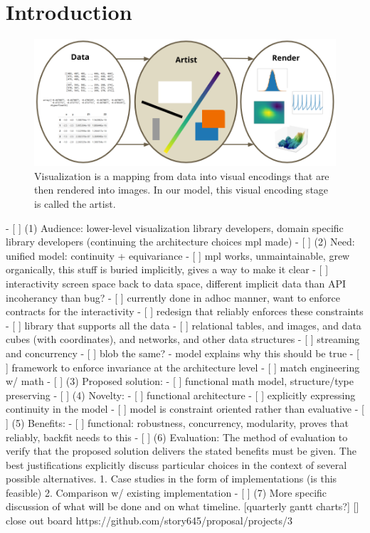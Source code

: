 \documentclass[../main.tex]{subfiles}
\begin{document}
\section{Introduction}
\label{sec:intro}
\begin{figure}[H]
    \includegraphics[width=\textwidth]{figures/intro/dar.png}
    \caption{Visualization is a mapping from data into visual encodings that are then rendered into images. In our model, this visual encoding stage is called the artist.}
    \label{fig:intro_artist_stages}
\end{figure}


- [ ] (1) Audience: lower-level visualization library developers, domain specific library developers (continuing the architecture choices mpl made)
- [ ] (2) Need: unified model: continuity + equivariance 
        - [ ] mpl works, unmaintainable, grew organically, this stuff is buried implicitly, gives a way to make it clear
        - [ ] interactivity screen space back to data space, different implicit data than API incoherancy than bug?
            - [ ] currently done in adhoc manner, want to enforce contracts for the interactivity 
        - [ ] redesign that reliably enforces these constraints 
        - [ ] library that supports all the data 
            - [ ] relational tables, and images, and data cubes (with coordinates), and networks, and other data structures
            - [ ] streaming and concurrency 
            - [ ] blob the same? - model explains why this should be true
        - [ ] framework to enforce invariance at the architecture level
        - [ ] match engineering w/ math
- [ ] (3) Proposed solution: 
    - [ ] functional math model, structure/type preserving 
- [ ] (4) Novelty:
    - [ ] functional architecture
    - [ ] explicitly expressing continuity in the model
    - [ ] model is constraint oriented rather than evaluative
- [ ] (5) Benefits: 
    - [ ] functional: robustness, concurrency, modularity, proves that reliably, backfit needs to this 
- [ ] (6) Evaluation: The method of evaluation to verify that the proposed solution delivers the stated benefits must be given.
        The best justifications explicitly discuss particular choices in the context of several possible alternatives.
        1. Case studies in the form of implementations (is this feasible) 
        2. Comparison w/ existing implementation          
- [ ] (7) More specific discussion of what will be done and on what timeline.
        [quarterly gantt charts?]
[] close out board https://github.com/story645/proposal/projects/3
\end{document}
